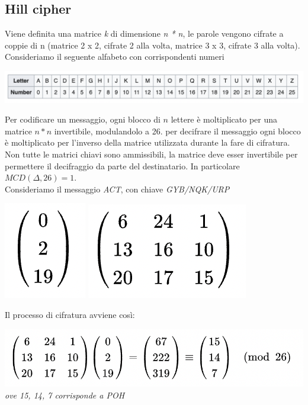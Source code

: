 \documentclass[11pt, oneside]{article}   	%
\begin{document}
\subsection*{Hill cipher}
Viene definita una matrice \emph{k} di dimensione \emph{n * n}, le parole vengono cifrate a coppie di n (matrice 2 x 2, cifrate 2 alla volta, matrice 3 x 3, cifrate 3 alla volta).\\
Consideriamo il seguente alfabeto con corrispondenti numeri
\begin{center}
\includegraphics[scale=0.5]{hill}
\end{center}
Per codificare un messaggio, ogni blocco di $n$ lettere è moltiplicato per una matrice $n * n$ invertibile, modulandolo a 26. per decifrare il messaggio ogni blocco è moltiplicato per l'inverso della matrice utilizzata durante la fare di cifratura.
Non tutte le matrici chiavi sono ammissibili, la matrice deve esser invertibile per permettere il decifraggio da parte del destinatario. In particolare \(MCD(\Delta, 26) = 1\).\\
Consideriamo il messaggio \emph{ACT}, con chiave \emph{GYB/NQK/URP}
\begin{center}
\includegraphics[scale=0.5]{2}
\includegraphics[scale=0.5]{1}
\end{center}
Il processo di cifratura avviene così:
\begin{center}
\includegraphics[scale=0.5]{3}\\
\emph{ove 15, 14, 7 corrisponde a POH}
\end{center}
\end{document}
